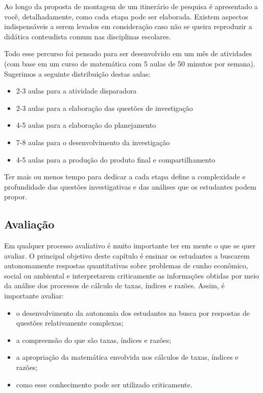 \begin{apresentacao}
Ao longo da proposta de montagem de um itinerário de pesquisa é apresentado a você, detalhadamente, como cada etapa pode ser elaborada. Existem aspectos indispensáveis a serem levados em consideração caso não se queira reproduzir a didática  conteudista comum nas disciplinas escolares.

Todo esse percurso foi pensado para ser desenvolvido em um mês de atividades (com base em um curso de matemática com 5 aulas de 50 minutos por semana). Sugerimos a seguinte distribuição destas aulas: 

\begin{itemize}
\item 2-3 aulas para a atividade disparadora
\item 2-3 aulas para a elaboração das questões de investigação
\item 4-5 aulas para a elaboração do planejamento 
\item 7-8 aulas para o desenvolvimento da investigação
\item 4-5 aulas para a produção do produto final e compartilhamento
\end{itemize}

Ter mais ou menos tempo para dedicar a cada etapa define a complexidade e profundidade das questões investigativas e das análises que os estudantes podem propor.

\subsection{Avaliação}

Em qualquer processo avaliativo é muito importante ter em mente o que se quer avaliar. O principal objetivo deste capítulo é ensinar os estudantes a buscarem autonomamente respostas quantitativas sobre problemas de cunho econômico, social ou ambiental e interpretarem criticamente as informações obtidas por meio da análise dos processos de cálculo de taxas, índices e razões. Assim, é importante avaliar:

\begin{itemize}
\item o desenvolvimento da autonomia dos estudantes na busca por respostas de questões relativamente complexas;
\item a compreensão do que são taxas, índices e razões;
\item a apropriação da matemática envolvida nos cálculos de taxas, índices e razões;
\item como esse conhecimento pode ser utilizado criticamente.
\end{itemize}


\end{apresentacao}
